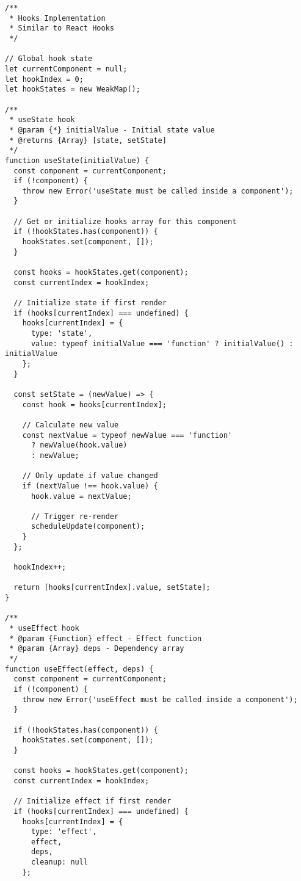 \documentclass[11pt]{article}
\begin{document}
\begin{verbatim}
/**
 * Hooks Implementation
 * Similar to React Hooks
 */

// Global hook state
let currentComponent = null;
let hookIndex = 0;
let hookStates = new WeakMap();

/**
 * useState hook
 * @param {*} initialValue - Initial state value
 * @returns {Array} [state, setState]
 */
function useState(initialValue) {
  const component = currentComponent;
  if (!component) {
    throw new Error('useState must be called inside a component');
  }
  
  // Get or initialize hooks array for this component
  if (!hookStates.has(component)) {
    hookStates.set(component, []);
  }
  
  const hooks = hookStates.get(component);
  const currentIndex = hookIndex;
  
  // Initialize state if first render
  if (hooks[currentIndex] === undefined) {
    hooks[currentIndex] = {
      type: 'state',
      value: typeof initialValue === 'function' ? initialValue() : initialValue
    };
  }
  
  const setState = (newValue) => {
    const hook = hooks[currentIndex];
    
    // Calculate new value
    const nextValue = typeof newValue === 'function' 
      ? newValue(hook.value) 
      : newValue;
    
    // Only update if value changed
    if (nextValue !== hook.value) {
      hook.value = nextValue;
      
      // Trigger re-render
      scheduleUpdate(component);
    }
  };
  
  hookIndex++;
  
  return [hooks[currentIndex].value, setState];
}

/**
 * useEffect hook
 * @param {Function} effect - Effect function
 * @param {Array} deps - Dependency array
 */
function useEffect(effect, deps) {
  const component = currentComponent;
  if (!component) {
    throw new Error('useEffect must be called inside a component');
  }
  
  if (!hookStates.has(component)) {
    hookStates.set(component, []);
  }
  
  const hooks = hookStates.get(component);
  const currentIndex = hookIndex;
  
  // Initialize effect if first render
  if (hooks[currentIndex] === undefined) {
    hooks[currentIndex] = {
      type: 'effect',
      effect,
      deps,
      cleanup: null
    };
    

\end{verbatim}
\end{document}
